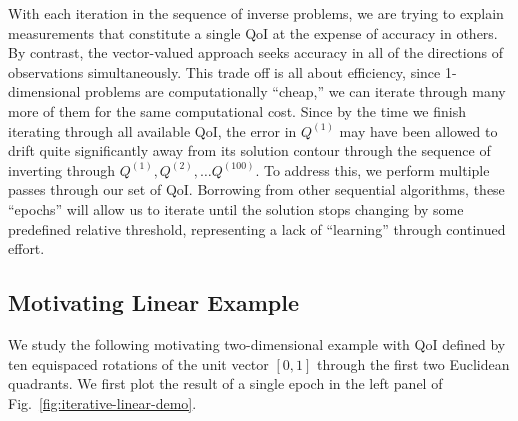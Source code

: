 With each iteration in the sequence of inverse problems, we are trying to explain measurements that constitute a single QoI at the expense of accuracy in others.
By contrast, the vector-valued approach seeks accuracy in all of the directions of observations simultaneously.
This trade off is all about efficiency, since 1-dimensional problems are computationally ``cheap,'' we can iterate through many more of them for the same computational cost.
Since by the time we finish iterating through all available QoI, the error in $Q^{(1)}$ may have been allowed to drift quite significantly away from its solution contour through the sequence of inverting through $Q^{(1)}, Q^{(2)}, \dots Q^{(100)}$.
To address this, we perform multiple passes through our set of QoI.
Borrowing from other sequential algorithms, these ``epochs'' will allow us to iterate until the solution stops changing by some predefined relative threshold, representing a lack of ``learning'' through continued effort.


\subsection{Motivating Linear Example}
We study the following motivating two-dimensional example with QoI defined by ten equispaced rotations of the unit vector $[0, 1]$ through the first two Euclidean quadrants.
We first plot the result of a single epoch in the left panel of Fig.~\ref{fig:iterative-linear-demo}.

